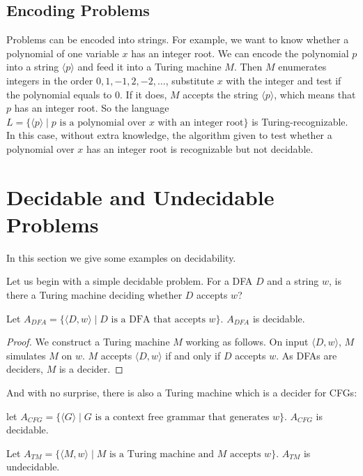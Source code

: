 \documentclass[11pt]{article}
\begin{document}
\subsection{Encoding Problems}

Problems can be encoded into strings. For example, we want to know whether a polynomial of one
variable $x$ has an integer root. We can encode the polynomial $p$ into a string $\langle p
\rangle$ and feed it into a Turing machine $M$. Then $M$ enumerates integers in the order $0,1,-1,
2,-2,\dots$, substitute $x$ with the integer and test if the polynomial equals to $0$. If it does,
$M$ accepts the string $\langle p \rangle$, which means that $p$ has an integer root. So the
language $L = \{\langle p \rangle \mid p \text{ is a polynomial over } x \text{ with an integer
root}\}$ is Turing-recognizable. In this case, without extra knowledge, the algorithm given to test
whether a polynomial over $x$ has an integer root is recognizable but not decidable.

\section{Decidable and Undecidable Problems}

In this section we give some examples on decidability.

Let us begin with a simple decidable problem. For a DFA $D$ and a string $w$, is there a Turing
machine deciding whether $D$ accepts $w$?

\begin{theorem}
Let $A_{DFA} = \{\langle D,w \rangle \mid D \text{ is a DFA that accepts } w\}$. $A_{DFA}$ is
decidable.
\end{theorem}

\begin{proof}
We construct a Turing machine $M$ working as follows. On input $\langle D,w \rangle$, $M$ simulates
$M$ on $w$. $M$ accepts $\langle D,w \rangle$ if and only if $D$ accepts $w$. As DFAs are deciders,
$M$ is a decider.
\end{proof}

And with no surprise, there is also a Turing machine which is a decider for CFGs:

\begin{theorem}
let $A_{CFG} = \{\langle G \rangle \mid G \text{ is a context free grammar that generates } w\}$.
$A_{CFG}$ is decidable.
\end{theorem}

\begin{theorem}
Let $A_{TM} = \{\langle M,w \rangle \mid M \text{ is a Turing machine and } M \text{ accepts } w\}$.
$A_{TM}$ is undecidable.
\end{theorem}
\end{document}
